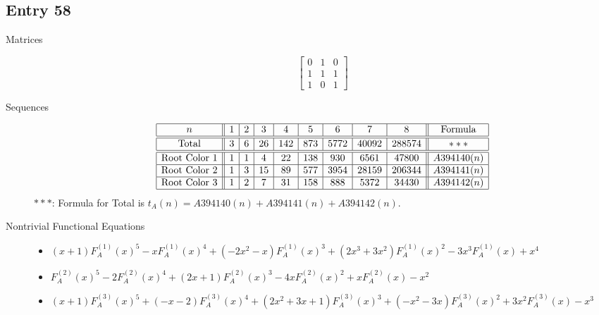 \documentclass[12pt]{amsart}
\newcommand{\gff}[2]{F_{#2}^{(#1)}(x)}
\newcommand{\gfa}[1]{\gff{#1}{A}}
\begin{document}
\subsection*{Entry 58}
\begin{description}
    \item[Matrices]
    
    \[\begin{bmatrix}
0 & 1 & 0 \\
1 & 1 & 1 \\
1 & 0 & 1
\end{bmatrix}\]
    \item[Sequences]\hspace*{\fill}\vspace{-0.5cm}
    \begin{center}
        \[
        \begin{array}{|c||c|c|c|c|c|c|c|c||c|}\hline
           n  & 1 & 2 & 3 & 4 & 5 & 6 & 7 & 8  & \text{Formula}\\\hline\hline
           \text{Total}  & 3 & 6 & 26 & 142 & 873 & 5772 & 40092 & 288574 & ***\\\hline\hline
           \text{Root Color }1 & 1 & 1 & 4 & 22 & 138 & 930 & 6561 & 47800 & A394140(n)\\\hline
           \text{Root Color }2 & 1 & 3 & 15 & 89 & 577 & 3954 & 28159 & 206344 & A394141(n)\\\hline
           \text{Root Color }3 & 1 & 2 & 7 & 31 & 158 & 888 & 5372 & 34430 & A394142(n)\\\hline
        \end{array}
        \]
        $***$: Formula for Total is $t_A(n)=A394140(n)+A394141(n)+A394142(n)$.
    \end{center}
    
    \item[Nontrivial Functional Equations]\hspace*{\fill}

    \begin{itemize}
\item $(x + 1)\gfa{1}^5-x\gfa{1}^4+(-2x^2 - x)\gfa{1}^3+(2x^3 + 3x^2)\gfa{1}^2-3x^3\gfa{1}+x^4$

\item $\gfa{2}^5-2\gfa{2}^4+(2x + 1)\gfa{2}^3-4x\gfa{2}^2+x\gfa{2}-x^2$


\item $(x + 1)\gfa{3}^5+(-x - 2)\gfa{3}^4+(2x^2 + 3x + 1)\gfa{3}^3+(-x^2 - 3x)\gfa{3}^2+3x^2\gfa{3}-x^3$


\end{itemize}
    
\end{description}
\end{document}
